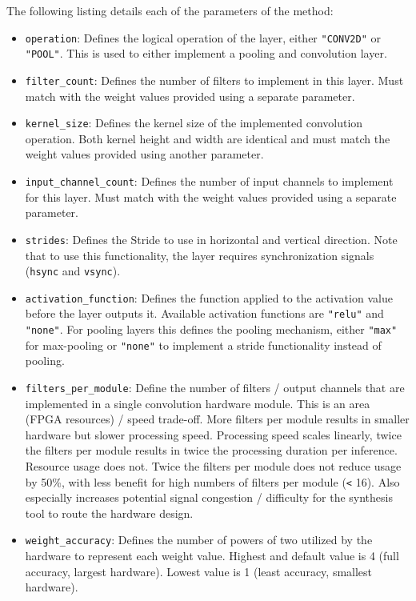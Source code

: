 The following listing details each of the parameters of the  method:
\begin{itemize}
\item \texttt{operation}: Defines the logical operation of the layer, either \texttt{"CONV2D"} or \texttt{"POOL"}. This is used to either implement a pooling and convolution layer.
\item \texttt{filter\_count}: Defines the number of filters to implement in this layer. Must match with the weight values provided using a separate parameter.
\item \texttt{kernel\_size}: Defines the kernel size of the implemented convolution operation. Both kernel height and width are identical and must match the weight values provided using another parameter.
\item \texttt{input\_channel\_count}: Defines the number of input channels to implement for this layer. Must match with the weight values provided using a separate parameter.
\item \texttt{strides}: Defines the Stride to use in horizontal and vertical direction. Note that to use this functionality, the layer requires synchronization signals (\texttt{hsync} and \texttt{vsync}).
\item \texttt{activation\_function}: Defines the function applied to the activation value before the layer outputs it. Available activation functions are \texttt{"relu"} and \texttt{"none"}. For pooling layers this defines the pooling mechanism, either \texttt{"max"} for max-pooling or \texttt{"none"} to implement a stride functionality instead of pooling.
\item \texttt{filters\_per\_module}: Define the number of filters / output channels that are implemented in a single convolution hardware module. This is an area (FPGA resources) / speed trade-off. More filters per module results in smaller hardware but slower processing speed. Processing speed scales linearly, twice the filters per module results in twice the processing duration per inference. Resource usage does not. Twice the filters per module does not reduce usage by 50\%, with less benefit for high numbers of filters per module (\texttt{<} 16). Also especially increases potential signal congestion / difficulty for the synthesis tool to route the hardware design.
\item \texttt{weight\_accuracy}: Defines the number of powers of two utilized by the hardware to represent each weight value. Highest and default value is 4 (full accuracy, largest hardware). Lowest value is 1 (least accuracy, smallest hardware).

\end{itemize}
